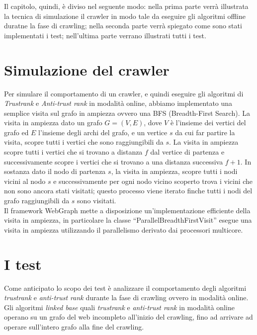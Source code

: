 Il capitolo, quindi, è diviso nel seguente modo: nella prima parte verrà illustrata la tecnica di simulazione il crawler in modo tale da eseguire gli algoritmi offline duratne la fase di crawling; nella seconda parte verrà spiegato come sono stati implementati i test; nell'ultima parte verrano illustrati tutti i test.

\section{Simulazione del crawler}
Per simulare il comportamento di un crawler, e quindi eseguire gli algoritmi di \textit{Trustrank} e \textit{Anti-trust rank} in modalità online, abbiamo implementato una semplice visita sul grafo in ampiezza ovvero una BFS \cite{bfsCormen} (Breadth-First Search). La visita in ampiezza dato un grafo \(G=(V,E)\), dove \(V\) è l'insieme dei vertici del grafo ed \(E\) l'insieme degli archi del grafo, e un vertice \(s\) da cui far partire la visita, scopre tutti i vertici che sono raggiungibili da \(s\). La visita in ampiezza scopre tutti i vertici che si trovano a distanza \(f\) dal vertice di partenza e successivamente scopre i vertici che si trovano a una distanza successiva \(f+1\). In sostanza dato il nodo di partenza \(s\), la visita in ampiezza, scopre tutti i nodi vicini al nodo \(s\) e successivamente per ogni nodo vicino scoperto trova i vicini che non sono ancora stati visitati; questo processo viene iterato finche tutti i nodi del grafo raggiungibili da \(s\) sono visitati. \\
Il framework WebGraph mette a disposizione un'implementazione efficiente della visita in ampiezza, in particolare  la classe ``ParallelBreadthFirstVisit'' esegue una visita in ampiezza utilizzando il parallelismo derivato dai processori multicore.

\section{I test}
Come anticipato lo scopo dei test è analizzare il comportamento degli algoritmi \textit{trustrank} e \textit{anti-trust rank} durante la fase di crawling ovvero in modalità online. Gli algoritmi \textit{linked base} quali \textit{trustrank} e \textit{anti-trust rank} in modalità online operano su un grafo del web incompleto all'inizio del crawling, fino ad arrivare ad operare sull'intero grafo alla fine del crawling.

